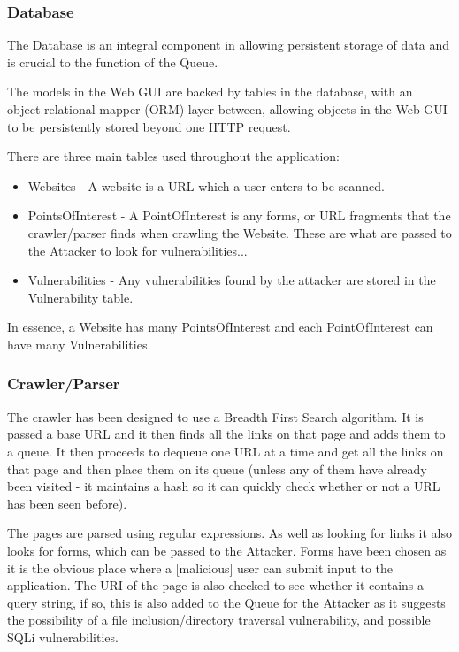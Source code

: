 \documentclass[12pt,a4paper]{article}
\begin{document}
\subsubsection{Database}
The Database is an integral component in allowing persistent storage of data and is crucial to the function of the Queue. 

The models in the Web GUI are backed by tables in the database, with an object-relational mapper (ORM) layer between, allowing objects in the Web GUI to be persistently stored beyond one HTTP request.

There are three main tables used throughout the application:

\begin{itemize}
    \item{Websites - A website is a URL which a user enters to be scanned.}
    \item{PointsOfInterest - A PointOfInterest is any forms, or URL fragments that the crawler/parser finds when crawling the Website.  These are what are passed to the Attacker to look for vulnerabilities...}
    \item{Vulnerabilities - Any vulnerabilities found by the attacker are stored in the Vulnerability table.}
\end{itemize}

In essence, a Website has many PointsOfInterest and each PointOfInterest can have many Vulnerabilities.

\subsubsection{Crawler/Parser}
The crawler has been designed to use a Breadth First Search algorithm.  It is passed a base URL and it then finds all the links on that page and adds them to a queue.  It then proceeds to dequeue one URL at a time and get all the links on that page and then place them on its queue (unless any of them have already been visited - it maintains a hash so it can quickly check whether or not a URL has been seen before).

The pages are parsed using regular expressions.  As well as looking for links it also looks for forms, which can be passed to the Attacker.  Forms have been chosen as it is the obvious place where a [malicious] user can submit input to the application.  The URI of the page is also checked to see whether it contains a query string, if so, this is also added to the Queue for the Attacker as it suggests the possibility of a file inclusion/directory traversal vulnerability, and possible SQLi vulnerabilities.
\end{document}
